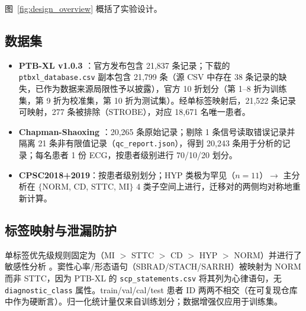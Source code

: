 图~\ref{fig:design_overview} 概括了实验设计。
\subsection{数据集}
\begin{itemize}
    \item \textbf{PTB-XL v1.0.3} \cite{wagner2020ptbxl}：官方发布包含 21,837 条记录；下载的 \texttt{ptbxl\_database.csv} 副本包含 21,799 条（源 CSV 中存在 38 条记录的缺失，已作为数据来源局限性予以披露），官方 10 折划分（第 1--8 折为训练集，第 9 折为校准集，第 10 折为测试集）。经单标签映射后，21,522 条记录可映射，277 条被排除（STROBE），对应 18,671 名唯一患者。
    \item \textbf{Chapman-Shaoxing} \cite{zheng2022ecgarrhythmia,goldberger2000}：20,265 条原始记录；剔除 1 条信号读取错误记录并隔离 21 条非有限值记录（\texttt{qc\_report.json}），得到 20,243 条用于分析的记录；每名患者 1 份 ECG，按患者级别进行 70/10/20 划分。
    \item \textbf{CPSC2018+2019}：按患者级别划分；HYP 类极为罕见（$n=11$）$\rightarrow$ 主分析在 $\{$NORM, CD, STTC, MI$\}$ 4 类子空间上进行，迁移对的两侧均对称地重新计算。
\end{itemize}
\subsection{标签映射与泄漏防护}
单标签优先级规则固定为（MI $>$ STTC $>$ CD $>$ HYP $>$ NORM）并进行了敏感性分析 \cite{wagner2020ptbxl,reyna2022}。窦性心率/形态语句（SBRAD/STACH/SARRH）被映射为 NORM 而非 STTC，因为 PTB-XL 的 \texttt{scp\_statements.csv} 将其列为心律语句，无 \texttt{diagnostic\_class} 属性。train\slash val\slash cal\slash test 患者 ID 两两不相交（在可复现仓库中作为硬断言）。归一化统计量仅来自训练划分；数据增强仅应用于训练集。
